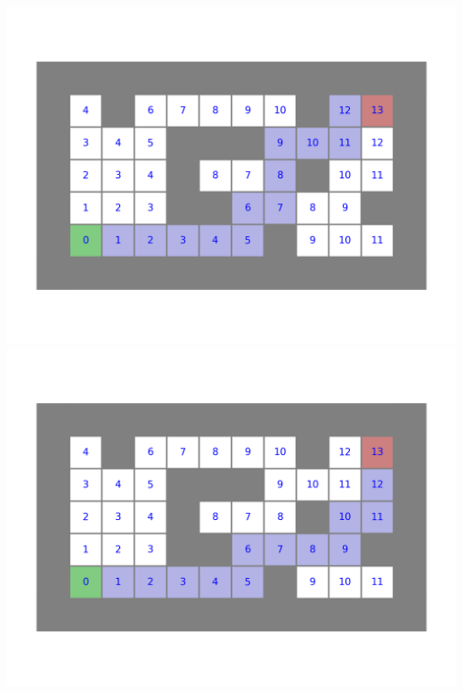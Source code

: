\documentclass[11pt,class=report,crop=false]{standalone}
\begin{document}
\begin{center}
	\includegraphics[scale=\myscale,scale=0.43]{figures/labyrinthe-01-14}
	\includegraphics[scale=\myscale,scale=0.43]{figures/labyrinthe-01-15}
\end{center}
\end{document}
